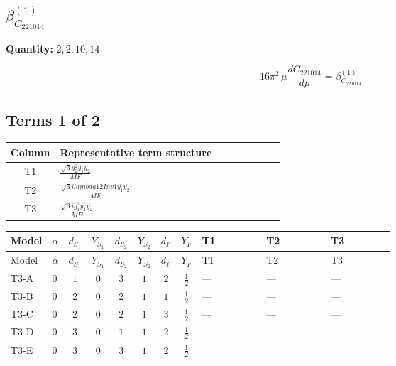 \documentclass[8pt]{article}
\begin{document}
\begin{landscape}
\section*{$\beta_{C_{221014}}^{(1)}$}
\noindent\textbf{Quantity: }$\mathrm{2,2,10,14}$\par\smallskip
\[16\pi^2\,\mu\frac{d C_{221014}}{d\mu}=\beta_{C_{221014}}^{(1)}\]
\subsection*{Terms 1 of 2}
\begin{center}
\begin{tabular}{@{}c >{\raggedright\arraybackslash}p{0.82\linewidth}@{}}
\toprule
Column & Representative term structure \\
\midrule
T1 & \(\displaystyle \frac{\sqrt{3} g_{2}^{2} \overline{y_{1}} \overline{y_{2}}}{MF}\) \\
\midrule
T2 & \(\displaystyle \frac{\sqrt{3} i lambda12Inv1 \overline{y_{1}} \overline{y_{2}}}{MF}\) \\
\midrule
T3 & \(\displaystyle \frac{\sqrt{3} i g_{1}^{2} \overline{y_{1}} \overline{y_{2}}}{MF}\) \\
\midrule
\bottomrule
\end{tabular}
\end{center}
\smallskip
\tiny
\begin{longtable}{@{}llcccccc >{\raggedright\arraybackslash}p{0.21\linewidth} >{\raggedright\arraybackslash}p{0.21\linewidth} >{\raggedright\arraybackslash}p{0.21\linewidth}@{}}
\toprule
Model & $\alpha$ & $d_{S_1}$ & $Y_{S_1}$ & $d_{S_2}$ & $Y_{S_2}$ & $d_F$ & $Y_F$ & T1 & T2 & T3 \\
\midrule
\endfirsthead
\toprule
Model & $\alpha$ & $d_{S_1}$ & $Y_{S_1}$ & $d_{S_2}$ & $Y_{S_2}$ & $d_F$ & $Y_F$ & T1 & T2 & T3 \\
\midrule
\endhead
T3-A & $0$ & $1$ & $0$ & $3$ & $1$ & $2$ & $\frac{1}{2}$ & --- & --- & --- \\
\midrule
T3-B & $0$ & $2$ & $0$ & $2$ & $1$ & $1$ & $\frac{1}{2}$ & --- & --- & --- \\
\midrule
T3-C & $0$ & $2$ & $0$ & $2$ & $1$ & $3$ & $\frac{1}{2}$ & --- & --- & --- \\
\midrule
T3-D & $0$ & $3$ & $0$ & $1$ & $1$ & $2$ & $\frac{1}{2}$ & --- & --- & --- \\
\midrule
T3-E & $0$ & $3$ & $0$ & $3$ & $1$ & $2$ & $\frac{1}{2}$ & \scriptsize\adjustbox{max width=\linewidth}{$\begin{gathered} - \frac{\sqrt{3} g_{2}^{2} \overline{y_{1}} \overline{y_{2}}}{6 MF}\end{gathered}$} & \scriptsize\adjustbox{max width=\linewidth}{$\begin{gathered} - \frac{\sqrt{3} i lambda12Inv1 \overline{y_{1}} \overline{y_{2}}}{6 MF}\end{gathered}$} & \scriptsize\adjustbox{max width=\linewidth}{$\begin{gathered} \frac{\sqrt{3} i g_{1}^{2} \overline{y_{1}} \overline{y_{2}}}{8 MF}\end{gathered}$} \\

\end{longtable}
\end{landscape}
\end{document}
